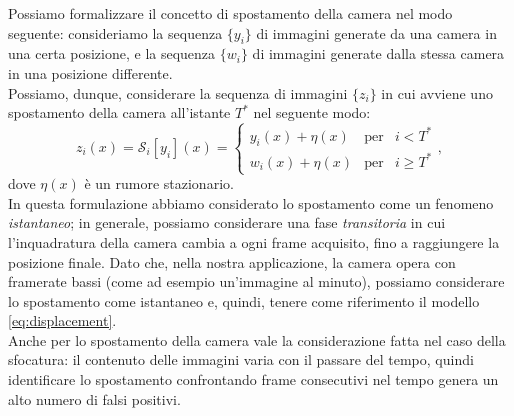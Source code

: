 Possiamo formalizzare il concetto di spostamento della camera nel modo seguente: consideriamo la sequenza $\{y_i\}$ di immagini generate da una camera in una certa posizione, e la sequenza $\{w_i\}$ di immagini generate dalla stessa camera in una posizione differente.\\
Possiamo, dunque, considerare la sequenza di immagini $\{z_i\}$ in cui avviene uno spostamento della camera all'istante $T^*$ nel seguente modo:
\begin{equation}
\label{eq:displacement}
z_i(x) = \mathcal{S}_i[y_i](x) = \left\{ \begin{array}{rcl}
	y_i(x) + \eta(x) & \mbox{per} & i < T^* \\
	w_i(x) + \eta(x) & \mbox{per} & i \geqslant T^*
	\end{array}\right. ,
\end{equation}
dove $\eta(x)$ \`e un rumore stazionario.\\
In questa formulazione abbiamo considerato lo spostamento come un fenomeno \textit{istantaneo};
in generale, possiamo considerare una fase \textit{transitoria} in cui l'inquadratura della camera cambia a ogni \gls{frame} acquisito, fino a raggiungere la posizione finale. 
Dato che, nella nostra applicazione, la camera opera con \gls{framerate} bassi (come ad esempio un'immagine al minuto), possiamo considerare lo spostamento come istantaneo e, quindi, tenere come riferimento il modello \eqref{eq:displacement}.\\
Anche per lo spostamento della camera vale la considerazione fatta nel caso della sfocatura: il contenuto delle immagini varia con il passare del tempo, quindi identificare lo spostamento confrontando frame consecutivi nel tempo genera un alto numero di falsi positivi.
